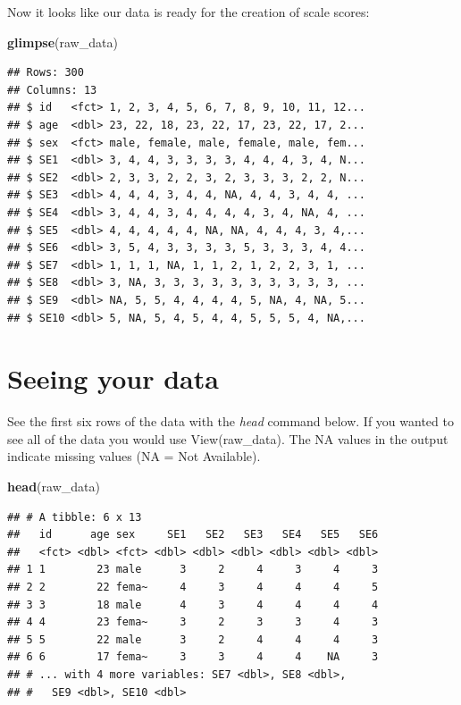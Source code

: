 \documentclass[
]{krantz}
\makeatletter
\newenvironment{Shaded}{\begin{snugshade}}{\end{snugshade}}
\newcommand{\KeywordTok}[1]{\textcolor[rgb]{0.27,0.27,0.27}{\textbf{#1}}}
\newcommand{\NormalTok}[1]{#1}
\newenvironment{kframe}{%
\medskip{}
\setlength{\fboxsep}{.8em}
 \def\at@end@of@kframe{}%
 \ifinner\ifhmode%
  \def\at@end@of@kframe{\end{minipage}}%
  \begin{minipage}{\columnwidth}%
 \fi\fi%
 \def\FrameCommand##1{\hskip\@totalleftmargin \hskip-\fboxsep
 \colorbox{shadecolor}{##1}\hskip-\fboxsep
     \hskip-\linewidth \hskip-\@totalleftmargin \hskip\columnwidth}%
 \MakeFramed {\advance\hsize-\width
   \@totalleftmargin\z@ \linewidth\hsize
   \@setminipage}}%
 {\par\unskip\endMakeFramed%
 \at@end@of@kframe}
\renewenvironment{Shaded}{\begin{kframe}}{\end{kframe}}
\makeatother
\begin{document}
Now it looks like our data is ready for the creation of scale scores:

\begin{Shaded}
\begin{Highlighting}[]
\KeywordTok{glimpse}\NormalTok{(raw_data)}
\end{Highlighting}
\end{Shaded}

\begin{verbatim}
## Rows: 300
## Columns: 13
## $ id   <fct> 1, 2, 3, 4, 5, 6, 7, 8, 9, 10, 11, 12...
## $ age  <dbl> 23, 22, 18, 23, 22, 17, 23, 22, 17, 2...
## $ sex  <fct> male, female, male, female, male, fem...
## $ SE1  <dbl> 3, 4, 4, 3, 3, 3, 3, 4, 4, 4, 3, 4, N...
## $ SE2  <dbl> 2, 3, 3, 2, 2, 3, 2, 3, 3, 3, 2, 2, N...
## $ SE3  <dbl> 4, 4, 4, 3, 4, 4, NA, 4, 4, 3, 4, 4, ...
## $ SE4  <dbl> 3, 4, 4, 3, 4, 4, 4, 4, 3, 4, NA, 4, ...
## $ SE5  <dbl> 4, 4, 4, 4, 4, NA, NA, 4, 4, 4, 3, 4,...
## $ SE6  <dbl> 3, 5, 4, 3, 3, 3, 3, 5, 3, 3, 3, 4, 4...
## $ SE7  <dbl> 1, 1, 1, NA, 1, 1, 2, 1, 2, 2, 3, 1, ...
## $ SE8  <dbl> 3, NA, 3, 3, 3, 3, 3, 3, 3, 3, 3, 3, ...
## $ SE9  <dbl> NA, 5, 5, 4, 4, 4, 4, 5, NA, 4, NA, 5...
## $ SE10 <dbl> 5, NA, 5, 4, 5, 4, 4, 5, 5, 5, 4, NA,...
\end{verbatim}

\hypertarget{seeing-your-data}{%
\section{Seeing your data}\label{seeing-your-data}}

See the first six rows of the data with the \emph{head} command below. If you wanted to see all of the data you would use View(raw\_data). The NA values in the output indicate missing values (NA = Not Available).

\begin{Shaded}
\begin{Highlighting}[]
\KeywordTok{head}\NormalTok{(raw_data)}
\end{Highlighting}
\end{Shaded}

\begin{verbatim}
## # A tibble: 6 x 13
##   id      age sex     SE1   SE2   SE3   SE4   SE5   SE6
##   <fct> <dbl> <fct> <dbl> <dbl> <dbl> <dbl> <dbl> <dbl>
## 1 1        23 male      3     2     4     3     4     3
## 2 2        22 fema~     4     3     4     4     4     5
## 3 3        18 male      4     3     4     4     4     4
## 4 4        23 fema~     3     2     3     3     4     3
## 5 5        22 male      3     2     4     4     4     3
## 6 6        17 fema~     3     3     4     4    NA     3
## # ... with 4 more variables: SE7 <dbl>, SE8 <dbl>,
## #   SE9 <dbl>, SE10 <dbl>
\end{verbatim}
\end{document}
